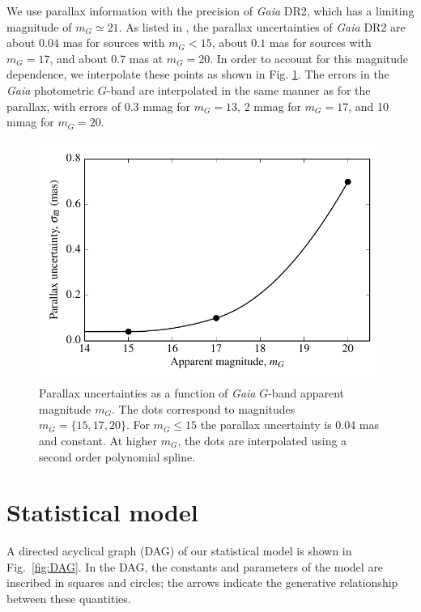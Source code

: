 \documentclass[fleqn,usenatbib]{mnras}
\begin{document}
We use parallax information with the precision of \emph{Gaia} DR2, which has a limiting magnitude of $m_G \simeq 21$. As listed in \cite{2018arXiv180409366L}, the parallax uncertainties of \emph{Gaia} DR2 are about $0.04$ mas for sources with $m_G<15$, about $0.1$ mas for sources with $m_G=17$, and about $0.7$ mas at $m_G=20$. In order to account for this magnitude dependence, we interpolate these points as shown in Fig. \ref{fig:parallax_error}. The errors in the \emph{Gaia} photometric $G$-band are interpolated in the same manner as for the parallax, with errors of 0.3 mmag for $m_G = 13$, 2 mmag for $m_G = 17$, and 10 mmag for $m_G = 20$.

\begin{figure}
	\includegraphics[width=\columnwidth]{parallax_error.pdf}
    \caption{Parallax uncertainties as a function of \emph{Gaia} $G$-band apparent magnitude $m_G$. The dots correspond to magnitudes $m_G=\{15,17,20\}$. For $m_G\leq 15$ the parallax uncertainty is 0.04 mas and constant. At higher $m_G$, the dots are interpolated using a second order polynomial spline.}
    \label{fig:parallax_error}
\end{figure}





\section{Statistical model}\label{sec:method}

A directed acyclical graph (DAG) of our statistical model is shown in Fig.~\ref{fig:DAG}. In the DAG, the constants and parameters of the model are inscribed in squares and circles; the arrows indicate the generative relationship between these quantities.
\end{document}
